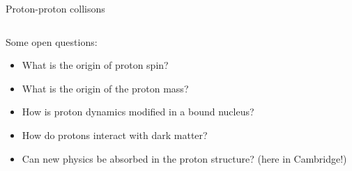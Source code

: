\documentclass[8pt,t]{beamer}
\begin{document}
\begin{frame}{Proton-proton collisons}
\begin{columns}
\begin{column}{0.5\textwidth}
      \vspace*{2em}
      Some open questions:
      \begin{itemize}
        \item What is the origin of proton spin?
        \item What is the origin of the proton mass?
        \item How is proton dynamics modified in a bound nucleus?
        \item How do protons interact with dark matter?
        \item Can new physics be absorbed in the proton structure? (here in Cambridge!)
      \end{itemize}
    \end{column}
  \end{columns}

\end{frame}

\end{document}
